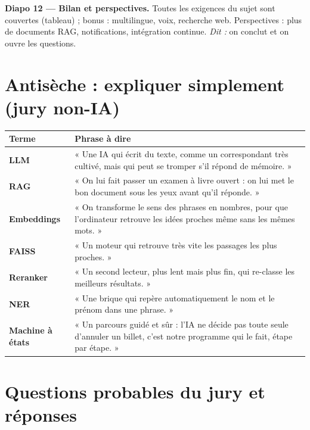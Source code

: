 \documentclass[11pt,a4paper]{article}
\begin{document}
\textbf{Diapo 12 --- Bilan et perspectives.}
Toutes les exigences du sujet sont couvertes (tableau) ; bonus : multilingue, voix,
recherche web. Perspectives : plus de documents RAG, notifications, intégration continue.
\emph{Dit :} on conclut et on ouvre les questions.

\section{Antisèche : expliquer simplement (jury non-IA)}

\begin{center}
\renewcommand{\arraystretch}{1.3}
\begin{tabular}{>{\bfseries}p{3cm} p{11cm}}
\toprule
Terme & Phrase à dire \\
\midrule
LLM & « Une IA qui écrit du texte, comme un correspondant très cultivé, mais qui peut se
tromper s'il répond de mémoire. » \\
RAG & « On lui fait passer un examen à livre ouvert : on lui met le bon document sous les
yeux avant qu'il réponde. » \\
Embeddings & « On transforme le sens des phrases en nombres, pour que l'ordinateur
retrouve les idées proches même sans les mêmes mots. » \\
FAISS & « Un moteur qui retrouve très vite les passages les plus proches. » \\
Reranker & « Un second lecteur, plus lent mais plus fin, qui re-classe les meilleurs
résultats. » \\
NER & « Une brique qui repère automatiquement le nom et le prénom dans une phrase. » \\
Machine à états & « Un parcours guidé et sûr : l'IA ne décide pas toute seule d'annuler
un billet, c'est notre programme qui le fait, étape par étape. » \\
\bottomrule
\end{tabular}
\end{center}

\section{Questions probables du jury et réponses}
\end{document}
